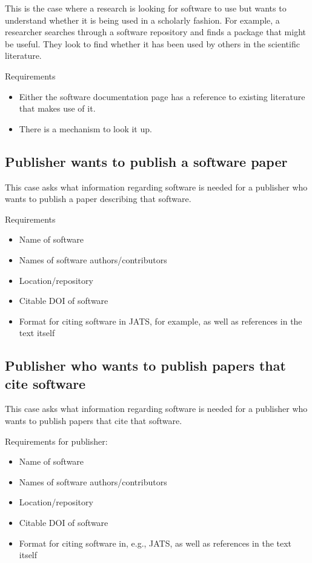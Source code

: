 \documentclass[12pt, oneside]{amsart}
\begin{document}
This is the case where a research is looking for software to use but wants to understand whether it is being used in a scholarly fashion.
For example, a researcher searches through a software repository and finds a package that might be useful.
They look to find whether it has been used by others in the scientific literature.

Requirements
\begin{itemize}
\item Either the software documentation page has a reference to existing literature that makes use of it.
\item There is a mechanism to look it up.
\end{itemize}

\subsection{Publisher wants to publish a software paper}

This case asks what information regarding software is needed for a publisher who wants to publish a paper describing that software.

Requirements
\begin{itemize}
\item Name of software
\item Names of software authors/contributors
\item Location/repository
\item Citable DOI of software
\item Format for citing software in JATS, for example, as well as references in the text itself
\end{itemize}

\subsection{Publisher who wants to publish papers that cite software}

This case asks what information regarding software is needed for a publisher who wants to publish papers that cite that software.

Requirements for publisher:
\begin{itemize}
\item Name of software
\item Names of software authors/contributors
\item Location/repository
\item Citable DOI of software
\item Format for citing software in, e.g., JATS, as well as references in the text itself
\end{itemize}
\end{document}
